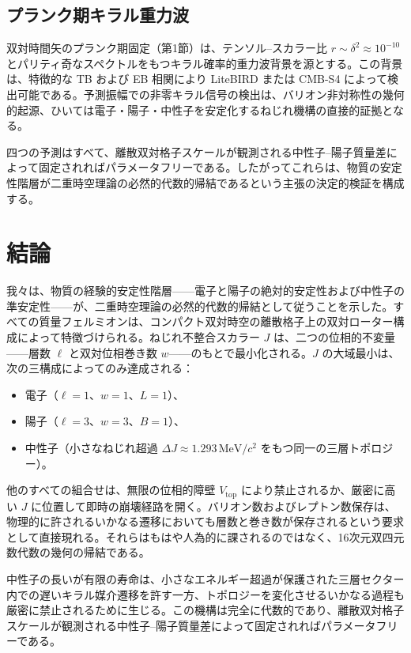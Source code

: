 \documentclass[a4paper]{article}
\begin{document}
\subsection{プランク期キラル重力波}

双対時間矢のプランク期固定（第1節）は、テンソル--スカラー比 \(r \sim \delta^2 \approx 10^{-10}\) とパリティ奇なスペクトルをもつキラル確率的重力波背景を源とする。この背景は、特徴的な TB および EB 相関により LiteBIRD または CMB-S4 によって検出可能である。予測振幅での非零キラル信号の検出は、バリオン非対称性の幾何的起源、ひいては電子・陽子・中性子を安定化するねじれ機構の直接的証拠となる。

四つの予測はすべて、離散双対格子スケールが観測される中性子--陽子質量差によって固定されればパラメータフリーである。したがってこれらは、物質の安定性階層が二重時空理論の必然的代数的帰結であるという主張の決定的検証を構成する。

\section{結論}

我々は、物質の経験的安定性階層——電子と陽子の絶対的安定性および中性子の準安定性——が、二重時空理論の必然的代数的帰結として従うことを示した。すべての質量フェルミオンは、コンパクト双対時空の離散格子上の双対ローター構成によって特徴づけられる。ねじれ不整合スカラー \(J\) は、二つの位相的不変量——層数 \(\ell\) と双対位相巻き数 \(w\)——のもとで最小化される。\(J\) の大域最小は、次の三構成によってのみ達成される：

\begin{itemize}
\item 電子（\(\ell=1\)、\(w=1\)、\(L=1\)）、
\item 陽子（\(\ell=3\)、\(w=3\)、\(B=1\)）、
\item 中性子（小さなねじれ超過 \(\Delta J \approx 1.293\,\mathrm{MeV}/c^2\) をもつ同一の三層トポロジー）。
\end{itemize}

他のすべての組合せは、無限の位相的障壁 \(V_\text{top}\) により禁止されるか、厳密に高い \(J\) に位置して即時の崩壊経路を開く。バリオン数およびレプトン数保存は、物理的に許されるいかなる遷移においても層数と巻き数が保存されるという要求として直接現れる。それらはもはや人為的に課されるのではなく、16次元双四元数代数の幾何の帰結である。

中性子の長いが有限の寿命は、小さなエネルギー超過が保護された三層セクター内での遅いキラル媒介遷移を許す一方、トポロジーを変化させるいかなる過程も厳密に禁止されるために生じる。この機構は完全に代数的であり、離散双対格子スケールが観測される中性子--陽子質量差によって固定されればパラメータフリーである。
\end{document}
